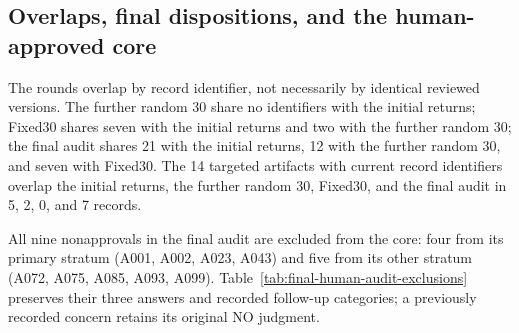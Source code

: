 \subsection{Overlaps, final dispositions, and the human-approved core}
\label{app:core-selection}
The rounds overlap by record identifier, not necessarily by identical reviewed versions. The further random 30 share no identifiers with the initial returns; Fixed30 shares seven with the initial returns and two with the further random 30; the final audit shares 21 with the initial returns, 12 with the further random 30, and seven with Fixed30. The 14 targeted artifacts with current record identifiers overlap the initial returns, the further random 30, Fixed30, and the final audit in 5, 2, 0, and 7 records.

All nine nonapprovals in the final audit are excluded from the core: four from its primary stratum (A001, A002, A023, A043) and five from its other stratum (A072, A075, A085, A093, A099). Table~\ref{tab:final-human-audit-exclusions} preserves their three answers and recorded follow-up categories; a previously recorded concern retains its original NO judgment.

